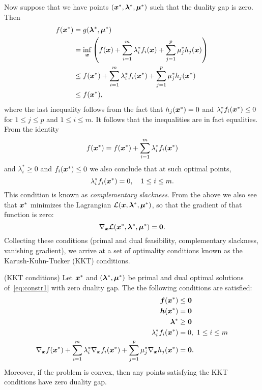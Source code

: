 Now suppose that we have points $(\bm{x}^*,\bm{\lambda}^*,\bm{\mu}^*)$ such that the duality gap is zero. Then
\begin{align*}
 f(\bm{x}^*) &= g(\bm{\lambda}^*,\bm{\mu}^*)\\
 &= \inf_{\bm{x}}\left(f(\bm{x})+\sum_{i=1}^m \lambda_i^*f_i(\bm{x})+\sum_{j=1}^p \mu_j^*h_j(\bm{x})\right)\\
 &\leq f(\bm{x}^*)+\sum_{i=1}^m \lambda_i^* f_i(\bm{x}^*)+\sum_{j=1}^p \mu_j^*h_j(\bm{x}^*)\\
 &\leq f(\bm{x}^*),
\end{align*}
where the last inequality follows from the fact that $h_j(\bm{x}^*)=0$ and $\lambda_i^* f_i(\bm{x}^*)\leq 0$ for $1\leq j\leq p$ and $1\leq i\leq m$. It follows that the inequalities are in fact equalities. From the identity
\begin{equation*}
 f(\bm{x}^*) = f(\bm{x}^*)+\sum_{i=1}^m \lambda_i^* f_i(\bm{x}^*)
\end{equation*}
and $\lambda_i^*\geq 0$ and $f_i(\bm{x}^*)\leq 0$ we also conclude that at such optimal points,
\begin{equation*}
 \lambda_i^* f_i(\bm{x}^*) = 0, \quad 1\leq i\leq m.
\end{equation*}
This condition is known as {\em complementary slackness}. From the above we also see that $\bm{x}^*$ minimizes the Lagrangian $\mathcal{L}(\bm{x},\bm{\lambda}^*,\bm{\mu}^*)$, so that the gradient of that function is zero:
\begin{equation*}
 \nabla_{\bm{x}}\mathcal{L}(\bm{x}^*,\bm{\lambda}^*,\bm{\mu}^*) = \bm{0}.
\end{equation*}
Collecting these conditions (primal and dual feasibility, complementary slackness, vanishing gradient), we arrive at a set of optimality conditions known as the Karush-Kuhn-Tucker (KKT) conditions.

\begin{theorem}(KKT conditions)
 Let $\bm{x}^*$ and $(\bm{\lambda}^*,\bm{\mu}^*)$ be primal and dual optimal solutions of~\eqref{eq:constr1} with zero duality gap. The the following conditions are satisfied:
 \begin{align*}
  \bm{f}(\bm{x}^*) & \leq \bm{0}\\
  \bm{h}(\bm{x}^*) & = \bm{0}\\
  \bm{\lambda}^*&\geq \bm{0}\\
  \lambda_i^*f_i(\bm{x}^*) & =0, \ 1\leq i\leq m\\
  \nabla_{\bm{x}} f(\bm{x}^*)+\sum_{i=1}^m \lambda_i^* \nabla_{\bm{x}}f_i(\bm{x}^*)+\sum_{j=1}^{p}\mu_j^*\nabla_{\bm{x}}h_j(\bm{x}^*) &= \bm{0}.
 \end{align*}
 Moreover, if the problem is convex, then any points satisfying the KKT conditions have zero duality gap.
\end{theorem}

